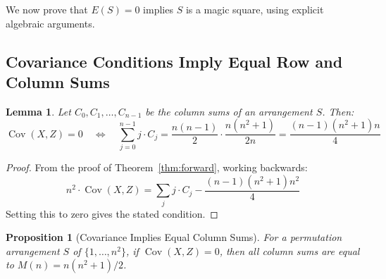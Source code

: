 \documentclass[11pt]{article}
\newtheorem{lemma}[theorem]{Lemma}
\newtheorem{proposition}[theorem]{Proposition}
\theoremstyle{definition}
\theoremstyle{remark}
\begin{document}
We now prove that $E(S) = 0$ implies $S$ is a magic square, using explicit algebraic arguments.

\subsection{Covariance Conditions Imply Equal Row and Column Sums}

\begin{lemma}\label{lem:col-constraint}
Let $C_0, C_1, \ldots, C_{n-1}$ be the column sums of an arrangement $S$. Then:
\[
\operatorname{Cov}(X, Z) = 0 \quad \Longleftrightarrow \quad \sum_{j=0}^{n-1} j \cdot C_j = \frac{n(n-1)}{2} \cdot \frac{n(n^2+1)}{2n} = \frac{(n-1)(n^2+1)n}{4}
\]
\end{lemma}

\begin{proof}
From the proof of Theorem~\ref{thm:forward}, working backwards:
\[
n^2 \cdot \operatorname{Cov}(X, Z) = \sum_j j \cdot C_j - \frac{(n-1)(n^2+1)n^2}{4}
\]
Setting this to zero gives the stated condition.
\end{proof}

\begin{proposition}[Covariance Implies Equal Column Sums]\label{prop:equal-cols}
For a permutation arrangement $S$ of $\{1, \ldots, n^2\}$, if $\operatorname{Cov}(X, Z) = 0$, then all column sums are equal to $M(n) = n(n^2+1)/2$.
\end{proposition}
\end{document}
